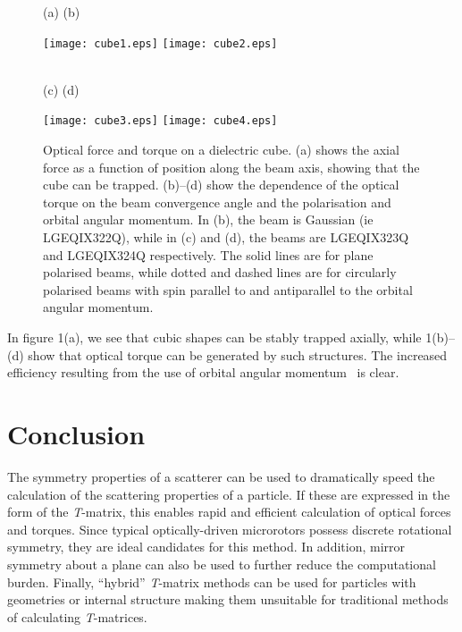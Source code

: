 \begin{figure}[!h]
(a) \hspace{0.47\columnwidth} (b) \\
\centerline{\texttt{[image: cube1.eps]}
\texttt{[image: cube2.eps]}} \\
(c)  \hspace{0.47\columnwidth} (d) \\
\centerline{\texttt{[image: cube3.eps]}
\texttt{[image: cube4.eps]}} 
\caption{Optical force and torque on a dielectric cube. (a) shows the
axial force as a function of position along the beam axis, showing that
the cube can be trapped. (b)--(d) show the dependence of the optical
torque on the beam convergence angle and the polarisation and orbital
angular momentum. In (b), the beam is Gaussian (ie LGEQIX322Q), while in
(c) and (d), the beams are LGEQIX323Q and LGEQIX324Q respectively.
The solid lines are for plane polarised beams, while dotted and dashed
lines are for circularly polarised beams with spin parallel to and
antiparallel to the orbital angular momentum.}
\label{fig1}
\end{figure}

In figure 1(a), we see that cubic shapes can be stably trapped axially,
while 1(b)--(d) show that optical torque can be generated by such
structures. The increased efficiency resulting from the use of 
orbital angular momentum~\cite{nieminen2004d} is clear.

\section{Conclusion}

The symmetry properties of a scatterer can be used to dramatically speed
the calculation of the scattering properties of a particle. If these
are expressed in the form of the \textit{T}-matrix, this enables rapid and
efficient calculation of optical forces and torques. Since typical
optically-driven microrotors possess discrete rotational symmetry, they are
ideal candidates for this method. In addition, mirror symmetry about
a plane can also be used to further reduce the computational burden.
Finally, ``hybrid'' \textit{T}-matrix methods can be used for particles
with geometries or internal structure making them unsuitable for
traditional methods of calculating \textit{T}-matrices.

